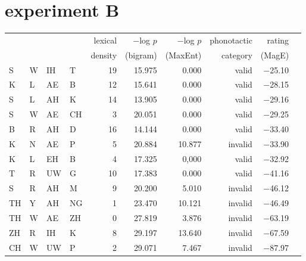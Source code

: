 \section{\citet{Greenberg1964} experiment B}  

\begin{longtable}{l@{ } l@{ } l@{ } l r r r r r r}
\toprule
   &   &    &    & lexical & $-$log $p$ & $-$log $p$ & phonotactic & rating \\
   &   &    &    & density & (bigram)   & (MaxEnt)   & category    & (MagE) \\
\midrule
S  & W & IH & T  & 19      & 15.975     & 0.000      & valid       & $-$25.10 \\
K  & L & AE & B  & 12      & 15.641     & 0.000      & valid       & $-$28.15 \\
S  & L & AH & K  & 14      & 13.905     & 0.000      & valid       & $-$29.16 \\
S  & W & AE & CH &  3      & 20.051     & 0.000      & valid       & $-$29.25 \\
B  & R & AH & D  & 16      & 14.144     & 0.000      & valid       & $-$33.40 \\
K  & N & AE & P  &  5      & 20.884     & 10.877     & invalid     & $-$33.90 \\
K  & L & EH & B  &  4      & 17.325     & 0,000      & valid       & $-$32.92 \\
T  & R & UW & G  & 10      & 17.383     & 0.000      & valid       & $-$41.16 \\
S  & R & AH & M  &  9      & 20.200     & 5.010      & invalid     & $-$46.12 \\
TH & Y & AH & NG &  1      & 23.470     & 10.121     & invalid     & $-$46.49 \\
TH & W & AE & ZH &  0      & 27.819     & 3.876      & invalid     & $-$63.19 \\
ZH & R & IH & K  &  8      & 29.197     & 13.640     & invalid     & $-$67.59 \\
CH & W & UW & P  &  2      & 29.071     & 7.467      & invalid     & $-$87.97 \\
\bottomrule
\end{longtable}
